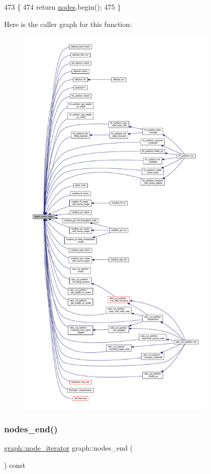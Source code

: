 \begin{DoxyCode}
473 \{
474     \textcolor{keywordflow}{return} \mbox{\hyperlink{classgraph_a4ea0592e8eb7c26c5abad24546907726}{nodes}}.begin();
475 \}
\end{DoxyCode}
Here is the caller graph for this function\+:
\nopagebreak
\begin{figure}[H]
\begin{center}
\leavevmode
\includegraphics[height=550pt]{classgraph_aec053a4b509d1be804237a80044c54c0_icgraph}
\end{center}
\end{figure}
\mbox{\label{classgraph_abbf9c0cb5629e98e1142254911238173}} 
\subsubsection{\texorpdfstring{nodes\+\_\+end()}{nodes\_end()}}
{\footnotesize\ttfamily \mbox{\hyperlink{classgraph_a2cb374b84c133ce13f94e73c3e5da7fa}{graph\+::node\+\_\+iterator}} graph\+::nodes\+\_\+end (\begin{DoxyParamCaption}{ }\end{DoxyParamCaption}) const\hspace{0.3cm}{\ttfamily [inherited]}}


